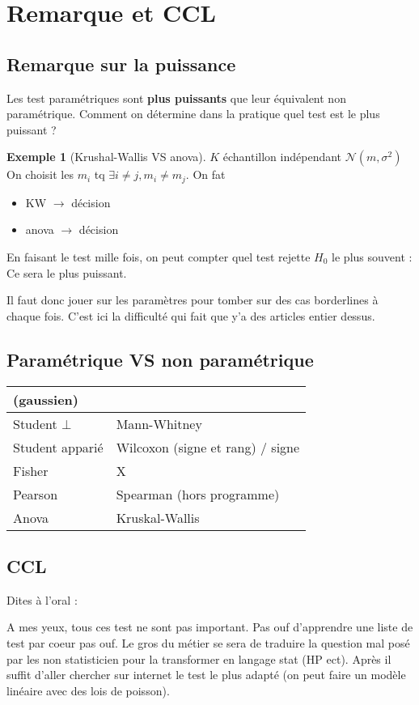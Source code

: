 \documentclass{article}
\theoremstyle{plain}%
\theoremstyle{definition}
\newtheorem{exmp}{Exemple}[section]
\theoremstyle{remark}
\begin{document}
\section{Remarque et CCL}
\subsection{Remarque  sur la puissance}
Les test paramétriques sont \textbf{plus puissants} que leur équivalent non paramétrique. Comment on détermine dans la pratique quel test est le plus puissant ? 
\begin{exmp}[Krushal-Wallis VS anova]
    $ K $ échantillon indépendant $ \mathcal{N}(m, \sigma ^2) $ On choisit les $ m_i $ tq $ \exists i \neq j, m_i \neq m_j $. On fat \begin{itemize}
        \item KW $\rightarrow$ décision 
        \item anova $\rightarrow$ décision
    \end{itemize}
    En faisant le test mille fois, on peut compter quel test rejette $ H_0 $ le plus souvent : Ce sera le plus puissant.

    Il faut donc jouer sur les paramètres pour tomber sur des cas borderlines à chaque fois. C'est ici la difficulté qui fait que y'a des articles entier dessus.
\end{exmp}

\subsection{Paramétrique VS non paramétrique}
\begin{table}[!ht]
    \centering
    \begin{tabular}{|l|l|}
    \hline
        (gaussien) & ~ \\ \hline
        Student $\bot$ & Mann-Whitney \\ \hline
        Student  apparié & Wilcoxon (signe et rang) / signe \\ \hline
        Fisher & X \\ \hline
        Pearson & Spearman (hors programme) \\ \hline
        Anova & Kruskal-Wallis \\ \hline
    \end{tabular}
\end{table}

\subsection{CCL}
Dites à l'oral : 

A mes yeux, tous ces test ne sont pas important. Pas ouf d'apprendre une liste de test par coeur pas ouf. Le gros du métier se sera de traduire la question mal posé par les non statisticien pour la transformer en langage stat (HP ect). Après il suffit d'aller chercher sur internet le test le plus adapté (on peut faire un modèle linéaire avec des lois de poisson).
\end{document}
